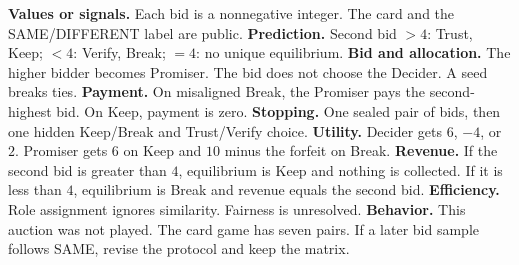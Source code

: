 \textbf{Values or signals.} Each bid is a nonnegative integer. The card and the SAME/DIFFERENT label are public. \textbf{Prediction.} Second bid $>4$: Trust, Keep; $<4$: Verify, Break; $=4$: no unique equilibrium. \textbf{Bid and allocation.} The higher bidder becomes Promiser. The bid does not choose the Decider. A seed breaks ties. \textbf{Payment.} On misaligned Break, the Promiser pays the second-highest bid. On Keep, payment is zero. \textbf{Stopping.} One sealed pair of bids, then one hidden Keep/Break and Trust/Verify choice. \textbf{Utility.} Decider gets $6$, $-4$, or $2$. Promiser gets $6$ on Keep and $10$ minus the forfeit on Break. \textbf{Revenue.} If the second bid is greater than $4$, equilibrium is Keep and nothing is collected. If it is less than $4$, equilibrium is Break and revenue equals the second bid. \textbf{Efficiency.} Role assignment ignores similarity. Fairness is unresolved. \textbf{Behavior.} This auction was not played. The card game has seven pairs. If a later bid sample follows SAME, revise the protocol and keep the matrix.
